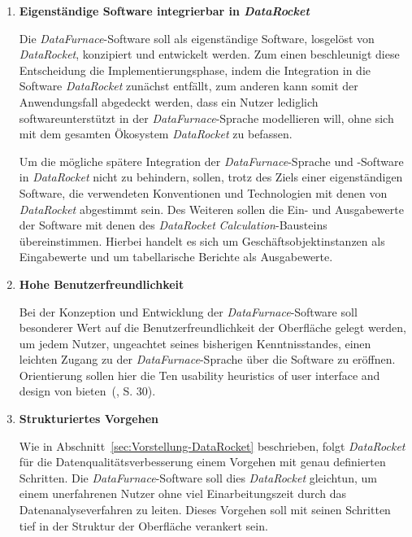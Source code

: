 \documentclass[
  language=german, %
  type=bachelor,%
  ngerman
]{isthesis}
\begin{document}
\begin{content}
\begin{enumerate}
    \item \textbf{Eigenständige Software integrierbar in \textit{DataRocket}}

      Die \textit{DataFurnace}-Software soll als eigenständige Software,
      losgelöst von \textit{DataRocket}, konzipiert und entwickelt werden. Zum
      einen beschleunigt diese Entscheidung die Implementierungsphase, indem
      die Integration in die Software \textit{DataRocket} zunächst entfällt,
      zum anderen kann somit der Anwendungsfall abgedeckt werden, dass ein Nutzer
      lediglich softwareunterstützt in der \textit{DataFurnace}-Sprache
      modellieren will, ohne sich mit dem gesamten Ökosystem
      \textit{DataRocket} zu befassen.

      Um die mögliche spätere Integration der \textit{DataFurnace}-Sprache und
      -Software in \textit{DataRocket} nicht zu behindern, sollen, trotz des
      Ziels einer eigenständigen Software, die verwendeten Konventionen und
      Technologien mit denen von \textit{DataRocket} abgestimmt sein.  Des
      Weiteren sollen die Ein- und Ausgabewerte der Software mit denen des
      \textit{DataRocket} \textit{Calculation}-Bausteins übereinstimmen.
      Hierbei handelt es sich um Geschäftsobjektinstanzen als Eingabewerte und
      um tabellarische Berichte als Ausgabewerte.

    \item \textbf{Hohe Benutzerfreundlichkeit}

			Bei der Konzeption und Entwicklung der \textit{DataFurnace}-Software soll
			besonderer Wert auf die Benutzerfreundlichkeit der Oberfläche gelegt
			werden, um jedem Nutzer, ungeachtet seines bisherigen Kenntnisstandes,
			einen leichten Zugang zu der \textit{DataFurnace}-Sprache über die
			Software zu eröffnen. Orientierung sollen hier die \glqq{}Ten usability
			heuristics of user interface and design\grqq{} von
			\textsc{\citeauthor{nielsen1994heuristic}}
			bieten~(\citeyear{nielsen1994heuristic}, S. 30).

      \newpage

    \item \textbf{Strukturiertes Vorgehen}

      Wie in Abschnitt~\ref{sec:Vorstellung-DataRocket} beschrieben, folgt
      \textit{DataRocket} für die Datenqualitätsverbesserung einem Vorgehen mit
      genau definierten Schritten. Die \textit{DataFurnace}-Software soll dies
      \textit{DataRocket} gleichtun, um einem unerfahrenen Nutzer ohne viel
      Einarbeitungszeit durch das Datenanalyseverfahren zu leiten.  Dieses
      Vorgehen soll mit seinen Schritten tief in der Struktur der Oberfläche
      verankert sein.


\end{enumerate}
\end{content}
\end{document}
